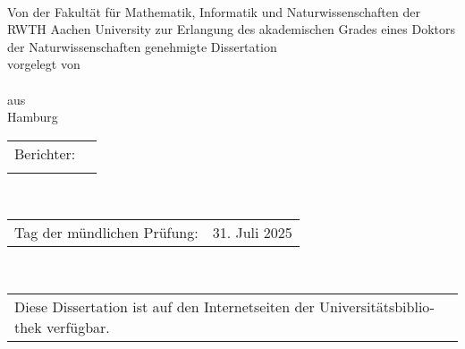 
\begin{titlepage}
	\begin{addmargin}[-0cm]{-0.5cm}
		\begin{otherlanguage}{ngerman}
		\begin{center}

			\vspace*{0cm}
			\begingroup
				\LARGE
				\color{RWTHblau}
				{\scshape \myTitle}\\
			\endgroup

			\vspace{3cm}
			\Large
			{Von der Fakultät für Mathematik, Informatik und Naturwissenschaften der RWTH Aachen University zur Erlangung des akademischen Grades eines Doktors der Naturwissenschaften genehmigte Dissertation}\\
			\vspace{0.3cm}
			{vorgelegt von}\\
			\vspace{3cm}
			{\myName}\\
			\vspace{0.3cm}
			\Large
			{aus} \\
			\vspace{0.3cm}
			\Large
			{Hamburg} \\



  	\end{center}
		\vfill
		\begin{tabular}{ll}
		\large{Berichter:} & \large{\myProf} \\
		& \large{\myOtherProf} \\
		\end{tabular} \\[0.6cm]
		\begin{tabular}{ll}
			\large{Tag der mündlichen Prüfung:} & \large{31. Juli 2025} \\
		\end{tabular} \\[0.6cm]
		\begin{tabular}{l}
		\large{Diese Dissertation ist auf den Internetseiten der Universitätsbibliothek verfügbar.}
		\end{tabular}
		\end{otherlanguage}
	\end{addmargin}
\end{titlepage}
